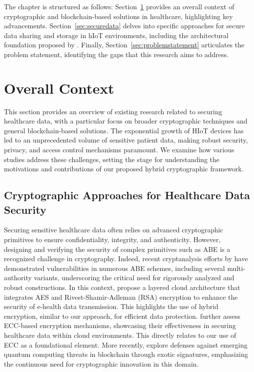 \documentclass[cic,tc,english]{iiufrgs}
\numberwithin{algorithm}{chapter}
\begin{document}
    The chapter is structured as follows: Section~\ref{sec:overallcontext} provides an overall context of cryptographic and blockchain-based solutions in healthcare, highlighting key advancements. Section~\ref{sec:securedata} delves into specific approaches for secure data sharing and storage in hIoT environments, including the architectural foundation proposed by \citet{laura2023}. Finally, Section~\ref{sec:problemstatement} articulates the problem statement, identifying the gaps that this research aims to address.

    \section{Overall Context}
    \label{sec:overallcontext}

        This section provides an overview of existing research related to securing healthcare data, with a particular focus on broader cryptographic techniques and general blockchain-based solutions. The exponential growth of HIoT devices has led to an unprecedented volume of sensitive patient data, making robust security, privacy, and access control mechanisms paramount. We examine how various studies address these challenges, setting the stage for understanding the motivations and contributions of our proposed hybrid cryptographic framework.

        \subsection{Cryptographic Approaches for Healthcare Data Security}
            Securing sensitive healthcare data often relies on advanced cryptographic primitives to ensure confidentiality, integrity, and authenticity. However, designing and verifying the security of complex primitives such as ABE is a recognized challenge in cryptography. Indeed, recent cryptanalysis efforts by \citet{broken2020} have demonstrated vulnerabilities in numerous ABE schemes, including several multi-authority variants, underscoring the critical need for rigorously analyzed and robust constructions. In this context, \citet{Memos2021} propose a layered cloud architecture that integrates AES and Rivest-Shamir-Adleman (RSA) encryption to enhance the security of e-health data transmission. This highlights the use of hybrid encryption, similar to our approach, for efficient data protection. \citet{Hema2019} further assess ECC-based encryption mechanisms, showcasing their effectiveness in securing healthcare data within cloud environments. This directly relates to our use of ECC as a foundational element. More recently, \citet{Naz2024} explore defenses against emerging quantum computing threats in blockchain through exotic signatures, emphasizing the continuous need for cryptographic innovation in this domain.
\end{document}
